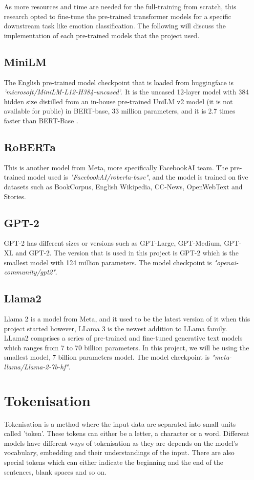 As more resources and time are needed for the full-training from scratch, this research opted to fine-tune the pre-trained transformer models for a specific downstream task like emotion classification. The following will discuss the implementation of each pre-trained models that the project used.

\subsection{MiniLM}
The English pre-trained model checkpoint that is loaded from huggingface is \textit{'microsoft/MiniLM-L12-H384-uncased'}. It is the uncased 12-layer model with 384 hidden size distilled from an in-house pre-trained UniLM v2 model (it is not available for public) in BERT-base, 33 million parameters, and it is 2.7 times faster than BERT-Base \cite{patrickvonplaten}.

\subsection{RoBERTa}
This is another model from Meta, more specifically FacebookAI team. The pre-trained model used is \emph{"FacebookAI/roberta-base"}, and the model is trained on five datasets such as BookCorpus, English Wikipedia, CC-News, OpenWebText and Stories\cite{Meta_roberta}. 

\subsection{GPT-2}
GPT-2 has different sizes or versions such as GPT-Large, GPT-Medium, GPT-XL and GPT-2. The version that is used in this project is GPT-2 which is the smallest model with 124 million parameters. The model checkpoint is \emph{"openai-community/gpt2"}\cite{openai-community/gpt2}.

\subsection{Llama2}
Llama 2 is a model from Meta, and it used to be the latest version of it when this project started however, LLama 3 is the newest addition to LLama family. LLama2 comprises a series of pre-trained and fine-tuned generative text models which ranges from 7 to 70 billion parameters\cite{Meta_2023}. In this project, we will be using the smallest model, 7 billion parameters model. The model checkpoint is \emph{"meta-llama/Llama-2-7b-hf"}\cite{Meta_2023}.

\section{Tokenisation}
Tokenisation is a method where the input data are separated into small units called 'token'. These tokens can either be a letter, a character or a word. Different models have different ways of tokenisation as they are depends on the model's vocabulary, embedding and their understandings of the input. There are also special tokens which can either indicate the beginning and the end of the sentences, blank spaces and so on.

